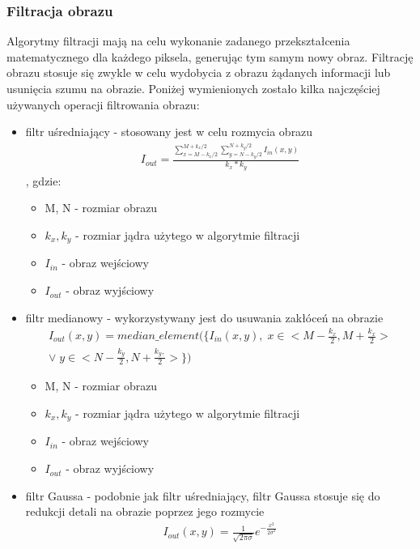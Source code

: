 \subsubsection{Filtracja obrazu}
Algorytmy filtracji mają na celu wykonanie zadanego przekształcenia matematycznego dla każdego piksela, generując tym samym nowy obraz. Filtrację obrazu stosuje się zwykle w celu wydobycia z obrazu żądanych informacji lub usunięcia szumu na obrazie. Poniżej wymienionych zostało kilka najczęściej używanych operacji filtrowania obrazu:
\begin{itemize}
\item filtr uśredniający - stosowany jest w celu rozmycia obrazu
  \begin{gather*}
    I_{out} = \frac{\sum_{x=M-k_x/2}^{M+k_x/2} \sum_{y=N-k_y/2}^{N+k_y/2} I_{in}(x, y)}{k_x*k_y}
  \end{gather*}, gdzie:
  \begin{itemize}
    \item M, N - rozmiar obrazu
    \item $k_x, k_y$ - rozmiar jądra użytego w algorytmie filtracji
    \item $I_{in}$ - obraz wejściowy
    \item $I_{out}$ - obraz wyjściowy
  \end{itemize}
\item filtr medianowy - wykorzystywany jest do usuwania zakłóceń na obrazie
  \begin{gather*}
    I_{out}(x, y) = median\_element(\{I_{in}(x, y), \;x \in <M-\frac{k_x}{2}, M+\frac{k_x}{2}> \\
    \vee\; y \in <N-\frac{k_y}{2}, N+\frac{k_y,}{2}>\})
    \end{gather*}
  \begin{itemize}
    \item M, N - rozmiar obrazu
    \item $k_x, k_y$ - rozmiar jądra użytego w algorytmie filtracji
    \item $I_{in}$ - obraz wejściowy
    \item $I_{out}$ - obraz wyjściowy
  \end{itemize}
\item filtr Gaussa - podobnie jak filtr uśredniający, filtr Gaussa stosuje się do redukcji detali na obrazie poprzez jego rozmycie
  \begin{gather*}
    I_{out}(x, y) = \frac{1}{\sqrt{2 \pi \sigma}} e^{-\frac{x^2}{2 \sigma^2}}
  \end{gather*}
\end{itemize}
